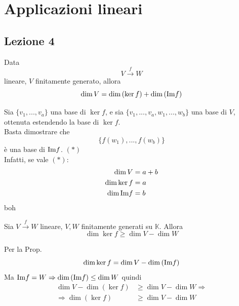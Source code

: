 


\newpage

\chapter{Applicazioni lineari}
\section{Lezione 4}

\begin{proposizione}
    Data
    \begin{equation}
        V\xrightarrow{f}W
    \end{equation}
    lineare, $V$ finitamente generato, allora
    \begin{equation}
        \dim{V}=\dim{(\ker{f})}+\dim{(\text{Im}f)}
    \end{equation}
\end{proposizione}

\begin{dimostrazione}

    Sia $ \{v_1,...,v_a\}$ una base di $\ker{f}$, e sia $\{v_1,...,v_a,w_1,...,w_b\}$ una base di $V$, ottenuta estendendo la base di $\ker{f}$. \\
    Basta dimostrare che
    \begin{equation}
        \{f(w_1),...,f(w_b)\}
    \end{equation}
    è una base di $\text{Im}f$. $(*)$ \\

    Infatti, se vale $(*)$:
    \begin{align}
        \dim{V}&=a+b \\
        \dim{\ker{f}}&=a \\
        \dim{\text{Im}f}&=b
    \end{align}
    boh

\end{dimostrazione}

\begin{corollario}
    Sia $V\xrightarrow{f}W$ lineare, $V,W$ finitamente generati su $\mathbb{K}$. Allora
    \begin{equation}
        \dim{\ker{f}}\geq\dim{V}-\dim{W}
    \end{equation}
\end{corollario}

\begin{dimostrazione}
    Per la Prop.
    \begin{equation}
        \dim{\ker{f}}=\dim{V}-\dim{( \text{Im}f )}
    \end{equation}
    Ma $\text{Im}f=W \Rightarrow \dim{(\text{Im}f)}\leq \dim{W}$ quindi
    \begin{align*}
        \dim{V}-\dim{( \ker{f} )} &\geq\dim{V}-\dim{W} \Rightarrow \\
        \Rightarrow \dim{(\ker{f})} &\geq \dim{V}-\dim{W}
    \end{align*}
\end{dimostrazione}

